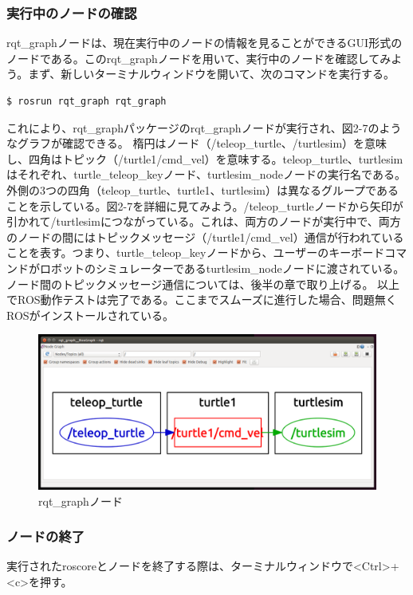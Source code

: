 \subsubsection{実行中のノードの確認}

rqt\_graphノードは、現在実行中のノードの情報を見ることができるGUI形式のノードである。このrqt\_graphノードを用いて、実行中のノードを確認してみよう。まず、新しいターミナルウィンドウを開いて、次のコマンドを実行する。

\begin{lstlisting}[language=ROS]
$ rosrun rqt_graph rqt_graph
\end{lstlisting}

これにより、rqt\_graphパッケージのrqt\_graphノードが実行され、図2-7のようなグラフが確認できる。
楕円はノード（/teleop\_turtle、/turtlesim）を意味し、四角はトピック（/turtle1/cmd\_vel）を意味する。teleop\_turtle、turtlesim はそれぞれ、turtle\_teleop\_keyノード、turtlesim\_nodeノードの実行名である。外側の3つの四角（teleop\_turtle、turtle1、turtlesim）は異なるグループであることを示している。図2-7を詳細に見てみよう。/teleop\_turtleノードから矢印が引かれて/turtlesimにつながっている。これは、両方のノードが実行中で、両方のノードの間にはトピックメッセージ（/turtle1/cmd\_vel）通信が行われていることを表す。つまり、turtle\_teleop\_keyノードから、ユーザーのキーボードコマンドがロボットのシミュレーターであるturtlesim\_nodeノードに渡されている。ノード間のトピックメッセージ通信については、後半の章で取り上げる。
以上でROS動作テストは完了である。ここまでスムーズに進行した場合、問題無くROSがインストールされている。

\begin{figure}[h]
  \centering
  \includegraphics[width=0.9\columnwidth]{pictures/chapter2/pic_02_04.png}
  \caption{rqt\_graphノード}
\end{figure}

\subsubsection{ノードの終了}
実行されたroscoreとノードを終了する際は、ターミナルウィンドウで<Ctrl>+<c>を押す。

